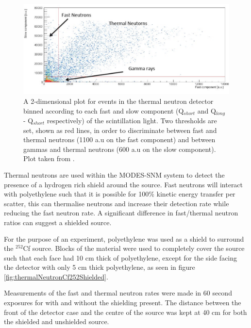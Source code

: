 \begin{figure}[htbp]
\begin{center}
\includegraphics[width=140mm]{Chapter8/figures/thermalToFastNeutronCut.pdf}
\caption{A 2-dimensional plot for events in the thermal neutron detector binned according to each fast and slow component (Q$_{short}$ and Q$_{long}$ - Q$_{short}$ respectively) of the scintillation light. Two thresholds are set, shown as red lines, in order to discriminate between fast and thermal neutrons (1100 a.u on the fast component) and between gammas and thermal neutrons (600 a.u on the slow component). Plot taken from \cite{modesInternal}.}
\label{fig:thermalFastNeutronCut}
\end{center}
\end{figure}

Thermal neutrons are used within the MODES-SNM system to detect the presence of a  hydrogen rich shield around the source. Fast neutrons will interact with polyethylene such that it is possible for 100\% kinetic energy transfer per scatter, this can thermalise neutrons and increase their detection rate while reducing the fast neutron rate. A significant difference in fast/thermal neutron ratios can suggest a shielded source. 

For the purpose of an experiment, polyethylene was used as a shield to surround the $^{252}$Cf source. Blocks of the material were used to completely cover the source such that each face had 10 cm thick of polyethylene, except for the side facing the detector with only 5 cm thick polyethylene, as seen in figure \ref{fig:thermalNeutronCf252Shielded}. 

Measurements of the fast and thermal neutron rates were made in 60 second exposures for with and without the shielding present. The distance between the front of the detector case and the centre of the source was kept at 40 cm for both the shielded and unshielded source. 


